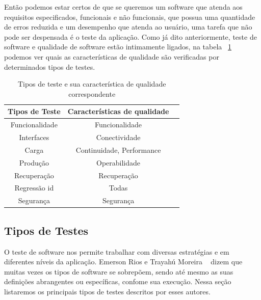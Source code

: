 Então podemos estar certos de que se queremos um software que atenda aos requisitos especificados, funcionais e não funcionais, que possua uma quantidade de erros reduzida e um desempenho que atenda ao usuário, uma tarefa que não pode ser despensada é o teste da aplicação. Como já dito anteriormente, teste de software e qualidade de software estão intimamente ligados, na tabela ~\ref{tab:testequalidade} podemos ver quais as características de qualidade são verificadas por determinados tipos de testes.

\begin{table}
	\caption{Tipos de teste e sua característica de qualidade correspondente}
	\begin{center}
	\begin{tabular}{ccc}
		\hline
			\textbf{Tipos de Teste} & \textbf{Características de qualidade} \\
		\hline
			Funcionalidade & Funcionalidade \\
			Interfaces & Conectividade \\
			Carga & Continuidade, Performance \\
			Produção & Operabilidade \\
			Recuperação & Recuperação \\
			Regressão id & Todas \\
			Segurança & Segurança \\
		\hline
	\end {tabular}
	\end{center}
	\label{tab:testequalidade}
\end{table}

\subsection{Tipos de Testes}



O teste de software nos permite trabalhar com diversas estratégias e em diferentes níveis da aplicação. Emerson Rios e Trayahú Moreira ~\cite{rios2006teste} dizem que muitas vezes os tipos de software se sobrepõem, sendo até mesmo as suas definições abrangentes ou específicas, confome sua execução. Nessa seção listaremos os principais tipos de testes descritos por esses autores.

